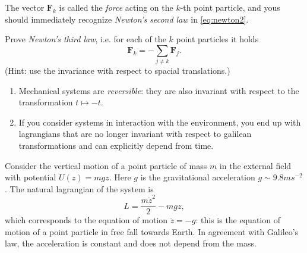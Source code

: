 \documentclass[english,fontsize=11pt,paper=a5,oneside]{scrbook}
\theoremstyle{definition}
\newenvironment{remark}
  {\pushQED{\qed}\renewcommand{\qedsymbol}{$\lozenge$}\remarkx}
  {\popQED\endremarkx}
\newenvironment{example}
  {\pushQED{\qed}\renewcommand{\qedsymbol}{$\lozenge$}\examplex}
  {\popQED\endexamplex}
\newenvironment{exercise}
  {\pushQED{\qed}\renewcommand{\qedsymbol}{$\maltese$}\exercisex}
  {\popQED\endexercisex}
\begin{document}
The vector $\bm{F}_k$ is called the \emph{force} acting on the $k$-th point particle, and yous should immediately recognize \emph{Newton's second law} in \eqref{eq:newton2}.

\begin{exercise}\label{ex:N3l1}
    Prove \emph{Newton's third law}, i.e. for each of the $k$ point particles it holds
    \begin{equation}
        \bm{F}_k = -\sum_{j\neq k} \bm{F}_j.
    \end{equation}
    (Hint: use the invariance with respect to spacial translations.)
\end{exercise}

\begin{remark}
\begin{enumerate}
    \item Mechanical systems are \emph{reversible}: they are also invariant with respect to the transformation $t\mapsto -t$.
    \item If you consider systems in interaction with the environment, you end up with lagrangians that are no longer invariant with respect to galilean transformations and can explicitly depend from time.
\end{enumerate}
\end{remark}

\begin{example}
    Consider the vertical motion of a point particle of mass $m$ in the external field with potential $U(z) = m g z$. Here $g$ is the gravitational acceleration $g \sim 9.8 m s^{-2}$. The natural lagrangian of the system is
    \begin{equation}
        L = \frac{m\dot z^2}2 - mgz,
    \end{equation}
    which corresponds to the equation of motion $\ddot z = -g$: this is the equation of motion of a point particle in free fall towards Earth. In agreement with Galileo's law, the acceleration is constant and does not depend from the mass.
\end{example}
\end{document}
